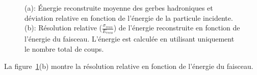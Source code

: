 \begin{figure}[!h]
  \begin{center}
    \caption{(a): Énergie reconstruite moyenne des gerbes hadroniques et déviation relative en fonction de l'énergie de la particule incidente. (b): Résolution relative ($\frac{\sigma_{reco}}{E_{reco}}$) de l'énergie reconstruite en fonction de l'énergie du faisceau. L'énergie est calculée en utilisant uniquement le nombre total de coups.}
    \label{fig:energy_bin}
  \end{center}
\end{figure}
La figure~\ref{fig:energy_bin}(b) montre la résolution relative en fonction de l'énergie du faisceau.


